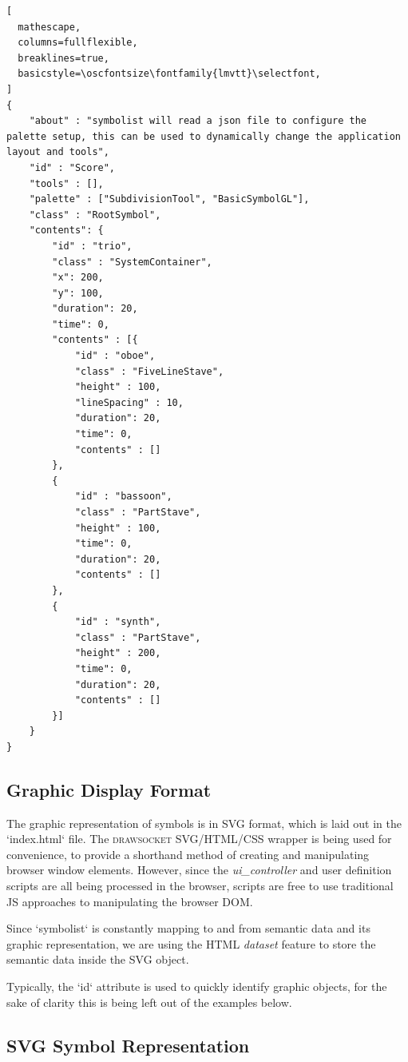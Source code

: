\documentclass{article}
\def\drawsocket{\textsc{drawsocket}\xspace}
\def\oscfontsize{\footnotesize}
\begin{document}
\begin{lstlisting}[
  mathescape,
  columns=fullflexible,
  breaklines=true,
  basicstyle=\oscfontsize\fontfamily{lmvtt}\selectfont,
]
{
    "about" : "symbolist will read a json file to configure the palette setup, this can be used to dynamically change the application layout and tools",
    "id" : "Score",
    "tools" : [],
    "palette" : ["SubdivisionTool", "BasicSymbolGL"],
    "class" : "RootSymbol",
    "contents": { 
        "id" : "trio",
        "class" : "SystemContainer",
        "x": 200,
        "y": 100,
        "duration": 20,
        "time": 0,
        "contents" : [{
            "id" : "oboe",
            "class" : "FiveLineStave",
            "height" : 100,
            "lineSpacing" : 10,
            "duration": 20,
            "time": 0,
            "contents" : []
        },
        {
            "id" : "bassoon",
            "class" : "PartStave",
            "height" : 100,
            "time": 0,
            "duration": 20,
            "contents" : []
        },
        {
            "id" : "synth",
            "class" : "PartStave",
            "height" : 200,
            "time": 0,
            "duration": 20,
            "contents" : []
        }]
    }
}
\end{lstlisting}


\subsection{Graphic Display Format}\label{subsec:file_format}

The graphic representation of symbols is in SVG format, which is laid out in the `index.html` file. The \drawsocket SVG/HTML/CSS wrapper is being used for convenience, to provide a shorthand method of creating and manipulating browser window elements. However, since the \textit{ui\_controller} and user definition scripts are all being processed in the browser, scripts are free to use traditional JS approaches to manipulating the browser DOM.

Since `symbolist` is constantly mapping to and from semantic data and its graphic representation, we are using the HTML \textit{dataset} feature to store the semantic data inside the SVG object.

Typically, the `id` attribute is used to quickly identify graphic objects, for the sake of clarity this is being left out of the examples below.

\subsection{SVG Symbol Representation}\label{subsec:symbol}
\end{document}
